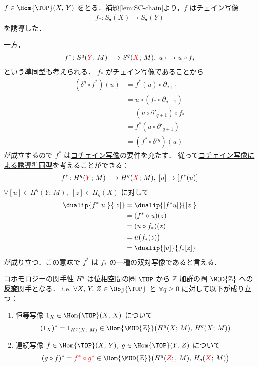 \documentclass[algtopo_main]{subfiles}
\begin{document}
$f \in \Hom{\TOP}(X,\, Y)$ をとる．補題\ref{lem:SC-chain}より，$f$ はチェイン写像
\begin{align}
    f_* \colon S_\bullet(X) \longrightarrow S_\bullet(Y)
\end{align}
を誘導した．

一方，
\begin{align}
    f^* \colon S^q(\textcolor{red}{Y};\, M) \longrightarrow S^q(\textcolor{red}{X};\, M),\; u \longmapsto u \circ f_*
\end{align}
という準同型も考えられる． $f_*$ がチェイン写像であることから
\begin{align}
    (\delta^q \circ f^*)(u) &= f^*(u) \circ \partial_{q+1} \\
    &= u \circ (f_* \circ \partial_{q+1}) \\
    &= (u \circ \partial'_{q+1}) \circ f_* \\
    &= f^*(u \circ \partial'_{q+1}) \\
    &= (f^* \circ \delta'{}^q)(u)
\end{align}
が成立するので $f^*$ は\hyperref[def:cochainmap]{コチェイン写像}の要件を充たす．
従って\hyperref[def:induced-cochain]{コチェイン写像による誘導準同型}を考えることができる：
\begin{align}
    f^* \colon H^q(\textcolor{red}{Y};\, M) \longrightarrow H^q(\textcolor{red}{X};\, M),\; [u] \mapsto [f^*(u)]
\end{align}
$\forall [u] \in H^q(Y;\, M),\; [z] \in H_q(X)$ に対して
\begin{align}
    \dualip{f^*[u]}{[z]} &= \dualip{[f^* u]}{[z]} \\
    &= (f^* \circ u)(z) \\
    &= (u \circ f_*)(z) \\
    &= u \bigl( f_*(z) \bigr) \\
    &= \dualip{[u]}{f_*[z]}
\end{align}
が成り立つ．この意味で $f^*$ は $f_*$ の一種の双対写像であると言える．

\begin{myprop}[label=prop:co-property1]{コホモロジーの関手性}
    $H^q$ は位相空間の圏 $\TOP$ から $\mathbb{Z}$ 加群の圏 $\MOD{\mathbb{Z}}$ への\textbf{反変}関手となる．
    i.e. $\forall X,\, Y,\, Z \in \Obj{\TOP}$ と $\forall q \ge 0$ に対して以下が成り立つ：
    \begin{enumerate}
        \item 恒等写像 $1_X \in \Hom{\TOP}(X,\, X)$ について
        \begin{align}
            (1_X)^* = 1_{H^q(X;\ M)} \in \Hom{\MOD{\mathbb{Z}}}\bigl( H^q(X;\, M),\, H^q(X;\, M) \bigr) 
        \end{align}
        \item 連続写像 $f \in \Hom{\TOP}(X,\, Y),\; g \in \Hom{\TOP}(Y,\, Z)$ について
        \begin{align}
            (g\circ f)^* = \textcolor{red}{f^* \circ g^*} \in \Hom{\MOD{\mathbb{Z}}}\bigl( H^q(\textcolor{red}{Z};,\, M),\, H_q(\textcolor{red}{X};\, M) \bigr) 
        \end{align}
    \end{enumerate}
\end{myprop}
\end{document}
